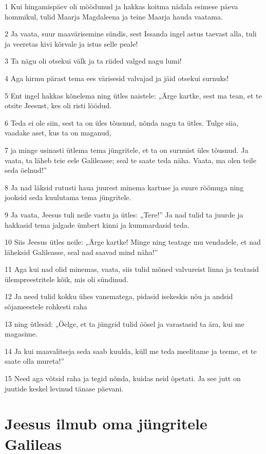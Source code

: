 \par 1 Kui hingamispäev oli möödunud ja hakkas koitma nädala esimese päeva hommikul, tulid Maarja Magdaleena ja teine Maarja hauda vaatama.
\par 2 Ja vaata, suur maavärisemine sündis, sest Issanda ingel astus taevast alla, tuli ja veeretas kivi kõrvale ja istus selle peale!
\par 3 Ta nägu oli otsekui välk ja ta riided valged nagu lumi!
\par 4 Aga hirmu pärast tema ees värisesid valvajad ja jäid otsekui surnuks!
\par 5 Ent ingel hakkas kõnelema ning ütles naistele: „Ärge kartke, sest ma tean, et te otsite Jeesust, kes oli risti löödud.
\par 6 Teda ei ole siin, sest ta on üles tõusnud, nõnda nagu ta ütles. Tulge siia, vaadake aset, kus ta on maganud,
\par 7 ja minge usinasti ütlema tema jüngritele, et ta on surnuist üles tõusnud. Ja vaata, ta läheb teie eele Galileasse; seal te saate teda näha. Vaata, ma olen teile seda öelnud!”
\par 8 Ja nad läksid rutusti haua juurest minema kartuse ja suure rõõmuga ning jooksid seda kuulutama tema jüngritele.
\par 9 Ja vaata, Jeesus tuli neile vastu ja ütles: „Tere!” Ja nad tulid ta juurde ja hakkasid tema jalgade ümbert kinni ja kummardasid teda.
\par 10 Siis Jeesus ütles neile: „Ärge kartke! Minge ning teatage mu vendadele, et nad läheksid Galileasse, seal nad saavad mind näha!”
\par 11 Aga kui nad olid minemas, vaata, siis tulid mõned valvureist linna ja teatasid ülempreestritele kõik, mis oli sündinud.
\par 12 Ja need tulid kokku ühes vanematega, pidasid isekeskis nõu ja andsid sõjameestele rohkesti raha
\par 13 ning ütlesid: „Öelge, et ta jüngrid tulid öösel ja varastasid ta ära, kui me magasime.
\par 14 Ja kui maavalitseja seda saab kuulda, küll me teda meelitame ja teeme, et te saate olla mureta!”
\par 15 Need aga võtsid raha ja tegid nõnda, kuidas neid õpetati. Ja see jutt on juutide keskel levinud tänase päevani.

\section*{Jeesus ilmub oma jüngritele Galileas}

